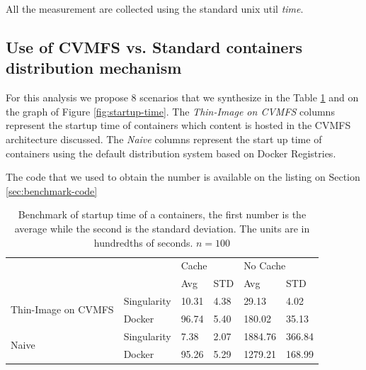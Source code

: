 All the measurement are collected using the standard unix util \textit{time}.

\subsection{Use of CVMFS vs. Standard containers distribution mechanism}

For this analysis we propose 8 scenarios that we synthesize in the Table
\ref{tab:benchmark} and on the graph of Figure \ref{fig:startup-time}. The
\textit{Thin-Image on CVMFS} columns represent the startup time of containers
which content is hosted in the CVMFS architecture discussed. The \textit{Naive}
columns represent the start up time of containers using the default
distribution system based on Docker Registries.

The code that we used to obtain the number is available on the listing on
Section \ref{sec:benchmark-code}

\begin{table}[]
\begin{tabular}{|l|l|l|l|l|l|}
\hline
\multicolumn{2}{|l|}{\multirow{2}{*}{}}            & \multicolumn{2}{l|}{Cache} & \multicolumn{2}{l|}{No Cache} \\ \cline{3-6} 
\multicolumn{2}{|l|}{}                             & Avg          & STD         & Avg            & STD          \\ \hline \hline
\multirow{2}{*}{Thin-Image on CVMFS} & Singularity & 10.31        & 4.38        & 29.13          & 4.02         \\ \cline{2-6} 
                                     & Docker      & 96.74        & 5.40        & 180.02         & 35.13        \\ \hline \hline
\multirow{2}{*}{Naive}               & Singularity & 7.38         & 2.07        & 1884.76        & 366.84       \\ \cline{2-6} 
                                     & Docker      & 95.26        & 5.29        & 1279.21        & 168.99       \\ \hline
\end{tabular}
\caption{Benchmark of startup time of a containers, the first number is the average while the second is the standard deviation. The units are in hundredths of seconds. $n = 100$}
\label{tab:benchmark}
\end{table}

